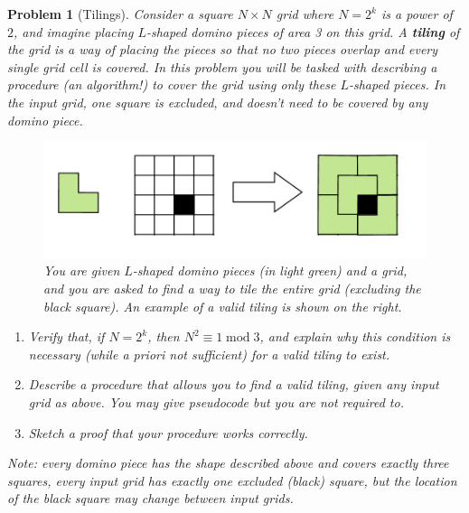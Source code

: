 \documentclass[10pt]{article}
\newtheorem{problem}{\sc\color{cit}Problem}
\begin{document}
\newpage



\newpage
\begin{problem}[Tilings] 
Consider a square $N \times N$ grid where $N = 2^k$ is a power of $2$, and imagine placing $L$-shaped domino pieces of area 3 on this grid. A \textbf{tiling} of the grid is a way of placing the pieces so that no two pieces overlap and every single grid cell is covered. In this problem you will be tasked with describing a procedure (an algorithm!) to cover the grid using only these $L$-shaped pieces. In the input grid, one square is excluded, and doesn't need to be covered by any domino piece.
\begin{figure}[H]
    \centering
    \includegraphics[scale=0.7]{tiling.png}
    \caption{You are given $L$-shaped domino pieces (in light green) and a grid, and you are asked to find a way to tile the entire grid (excluding the black square). An example of a valid tiling is shown on the right.}
    \label{fig:my_label}
\end{figure}
\noindent 
\begin{enumerate}
    \item[(a)] Verify that, if $N = 2^k$, then $N^2 \equiv 1 \operatorname{ mod } 3$, and explain why this condition is necessary (while a priori not sufficient) for a valid tiling to exist.
    \item[(b)] Describe a procedure that allows you to find a valid tiling, given any input grid as above. You may give pseudocode but you are not required to.
    \item[(c)] Sketch a proof that your procedure works correctly.
\end{enumerate}
Note: every domino piece has the shape described above and covers exactly three squares, every input grid has exactly one excluded (black) square, but the location of the black square may change between input grids.
\end{problem}
\end{document}
